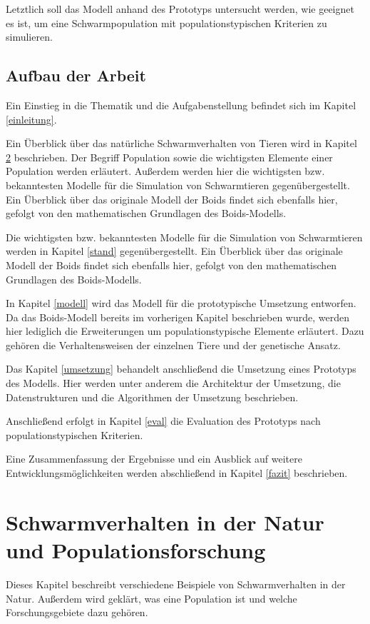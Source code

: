 \documentclass[draft=false
              ,paper=a4
              ,twoside=false
              ,fontsize=11pt
              ,headsepline
              ,BCOR10mm
              ,DIV11
              ,bibtotoc
              ,liststotoc
              ]{scrbook}
\begin{document}
Letztlich soll das Modell anhand des Prototyps untersucht werden, wie geeignet es ist, um eine Schwarmpopulation mit populationstypischen Kriterien zu simulieren.

\section{Aufbau der Arbeit}
Ein Einstieg in die Thematik und die Aufgabenstellung befindet sich im Kapitel \ref{einleitung}.

Ein Überblick über das natürliche Schwarmverhalten von Tieren wird in Kapitel \ref{natur} beschrieben. Der Begriff Population sowie die wichtigsten Elemente einer Population werden erläutert. Außerdem werden hier die wichtigsten bzw. bekanntesten Modelle für die Simulation von Schwarmtieren gegenübergestellt. Ein Überblick über das originale Modell der Boids findet sich ebenfalls hier, gefolgt von den mathematischen Grundlagen des Boids-Modells.

Die wichtigsten bzw. bekanntesten Modelle für die Simulation von Schwarmtieren werden in Kapitel \ref{stand} gegenübergestellt. Ein Überblick über das originale Modell der Boids findet sich ebenfalls hier, gefolgt von den mathematischen Grundlagen des Boids-Modells.

In Kapitel \ref{modell} wird das Modell für die prototypische Umsetzung entworfen. Da das Boids-Modell bereits im vorherigen Kapitel beschrieben wurde, werden hier lediglich die Erweiterungen um populationstypische Elemente erläutert. Dazu gehören die Verhaltensweisen der einzelnen Tiere und der genetische Ansatz.

Das Kapitel \ref{umsetzung} behandelt anschließend die Umsetzung eines Prototyps des Modells. Hier werden unter anderem die Architektur der Umsetzung, die Datenstrukturen und die Algorithmen der Umsetzung beschrieben.

Anschließend erfolgt in Kapitel \ref{eval} die Evaluation des Prototyps nach populationstypischen Kriterien.

Eine Zusammenfassung der Ergebnisse und ein Ausblick auf weitere Entwicklungsmöglichkeiten werden abschließend in Kapitel \ref{fazit} beschrieben.

\chapter{Schwarmverhalten in der Natur und Populationsforschung}\label{natur}
Dieses Kapitel beschreibt verschiedene Beispiele von Schwarmverhalten in der Natur. Außerdem wird geklärt, was eine Population ist und welche Forschungsgebiete dazu gehören.
\end{document}
